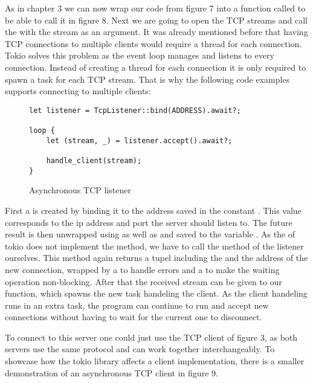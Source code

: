 As in chapter 3 we can now wrap our code from figure 7 into a function called  to be able to call
it in figure 8. Next we are going to open the TCP streams and call the  with the stream as an
argument. It was already mentioned before that having TCP connections to multiple clients would require a thread for
each connection. Tokio solves this problem as the event loop manages and listens to every connection. Instead of
creating a thread for each connection it is only required to spawn a task for each TCP stream. That is why the
following code examples supports connecting to multiple clients:

\begin{figure}[h]
    \begin{verbatim}
let listener = TcpListener::bind(ADDRESS).await?;

loop {
    let (stream, _) = listener.accept().await?;

    handle_client(stream);
}
    \end{verbatim}
    \caption{Asynchronous TCP listener}
\end{figure}

First a  is created by binding it to the address saved in the  constant
. This value corresponds to the ip address and port the server should listen to. The future result is
then unwrapped using  as well as  and saved to the variable . As the
 of tokio does not implement the  method, we have to call the  method of
the listener ourselves. This method again returns a tupel including the  and the address of the new
connection, wrapped by a  to handle errors and a  to make the waiting operation non-blocking.
After that the received stream can be given to our  function, which spawns the new task handeling
the client. As the client handeling runs in an extra task, the program can continue to run and accept new connections
without having to wait for the current one to disconnect.

To connect to this server one could just use the TCP client of figure 3, as both servers use the same protocol and can
work together interchangeably. To showcase how the tokio library affects a client implementation, there is a smaller
demonstration of an asynchronous TCP client in figure 9.

